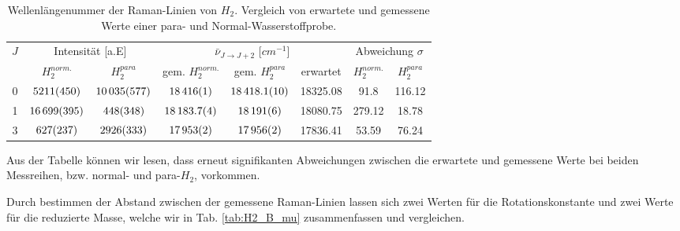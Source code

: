 \documentclass[11 pt]{article}
\begin{document}
\begin{table}[!htbp]
 \begin{center}
  \caption{\small Wellenlängenummer der Raman-Linien von $H_2$. Vergleich von erwartete und gemessene Werte einer para- und Normal-Wasserstoffprobe.}
  \label{tab:H2}
  \renewcommand{\arraystretch}{1.3} %
  \begin{tabular}{|c|c|c|c|c|c|c|c|}
  \hline
\multirow{2}{*}{$J$}&\multicolumn{2}{c|}{Intensität [a.E]}& \multicolumn{3}{c|}{$\bar{\nu}_{J\to J+2}$ [$\unit{cm^{-1}}$]} & \multicolumn{2}{c|}{ Abweichung $\sigma$} \\ \cline{2-8} %
 					 &$H_2^{norm.}$	&	$H_2^{para}$ & gem. $H_2^{norm.}$ & gem. $H_2^{para}$& erwartet &  $H_2^{norm.}$	&	$H_2^{para}$\\ 
  \hline
	\hline 
0 &	$\num{5211\pm450}$ 	&	$\num{10035\pm577}$	&	$\num{18416	\pm 1}$	& $\num{18418.1\pm 1}$	& 18325.08	& 91.8	& 116.12 \\ 
1 & 	$\num{16699\pm395}$	&	$\num{448\pm348}$	&	$\num{18183.7\pm0.4}$& $\num{18191\pm6}$	& 18080.75	& 279.12	& 18.78 \\ 
3 &	$\num{627\pm237}$	&	$\num{2926\pm333}$	&	$\num{17953\pm2}$	& $\num{17956\pm2}$	& 17836.41	& 53.59	& 76.24\\ 
	\hline
  \end{tabular}
  \renewcommand{\arraystretch}{1}
 \end{center}
\end{table}

Aus der Tabelle können wir lesen, dass erneut signifikanten Abweichungen zwischen die erwartete und gemessene Werte bei beiden Messreihen, bzw. normal- und para-$H_2$, vorkommen.  

Durch bestimmen der Abstand zwischen der gemessene Raman-Linien lassen sich zwei Werten für die Rotationskonstante und zwei Werte für die reduzierte Masse, welche wir in Tab. \ref{tab:H2_B_mu} zusammenfassen und vergleichen. 
\end{document}
